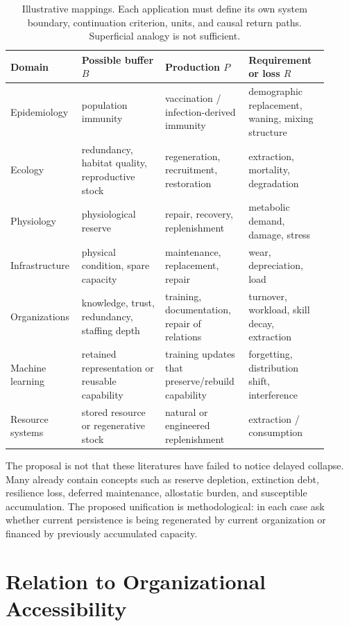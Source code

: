 \documentclass[11pt,a4paper]{article}
\begin{document}
\begin{table}[htbp]
\centering
\small
\begin{tabular}{p{0.17\linewidth}p{0.25\linewidth}p{0.25\linewidth}p{0.24\linewidth}}
\toprule
Domain & Possible buffer $B$ & Production $P$ & Requirement or loss $R$ \\
\midrule
Epidemiology & population immunity & vaccination / infection-derived immunity & demographic replacement, waning, mixing structure \\
Ecology & redundancy, habitat quality, reproductive stock & regeneration, recruitment, restoration & extraction, mortality, degradation \\
Physiology & physiological reserve & repair, recovery, replenishment & metabolic demand, damage, stress \\
Infrastructure & physical condition, spare capacity & maintenance, replacement, repair & wear, depreciation, load \\
Organizations & knowledge, trust, redundancy, staffing depth & training, documentation, repair of relations & turnover, workload, skill decay, extraction \\
Machine learning & retained representation or reusable capability & training updates that preserve/rebuild capability & forgetting, distribution shift, interference \\
Resource systems & stored resource or regenerative stock & natural or engineered replenishment & extraction / consumption \\
\bottomrule
\end{tabular}
\caption{Illustrative mappings. Each application must define its own system boundary, continuation criterion, units, and causal return paths. Superficial analogy is not sufficient.}
\label{tab:domains}
\end{table}

The proposal is not that these literatures have failed to notice delayed collapse. Many already contain concepts such as reserve depletion, extinction debt, resilience loss, deferred maintenance, allostatic burden, and susceptible accumulation. The proposed unification is methodological: in each case ask whether current persistence is being regenerated by current organization or financed by previously accumulated capacity.

\section{Relation to Organizational Accessibility}
\end{document}
